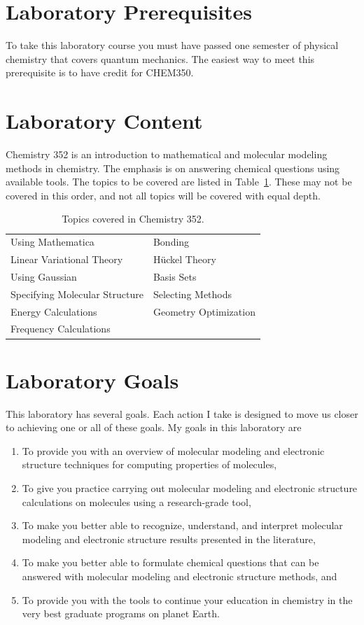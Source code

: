 \documentclass[letterpaper,oneside,onecolumn,11pt,article]{memoir}
\begin{document}
\section{Laboratory Prerequisites}
To take this laboratory course you must have passed one semester of physical chemistry that covers quantum mechanics. The easiest way to meet this prerequisite is to have credit for CHEM350. 

\section{Laboratory Content}
Chemistry 352 is an introduction to mathematical and molecular modeling methods in chemistry. The emphasis is on answering chemical questions using available tools. The topics to be covered are listed in Table~\ref{tab:topics}. These may not be covered in this order, and not all topics will be covered with equal depth. 

\begin{table}[h]
\caption{\sffamily Topics covered in Chemistry 352.}
\label{tab:topics}
\begin{tabular}{l|l} \toprule
Using Mathematica & Bonding \\
Linear Variational Theory & H\"uckel Theory \\
Using Gaussian & Basis Sets \\
Specifying Molecular Structure & Selecting Methods \\
Energy Calculations & Geometry Optimization \\
Frequency Calculations & \\ 
\bottomrule
\end{tabular}
\end{table}
%
%
\section{Laboratory Goals}
This laboratory has several goals. Each action I take is designed to move us closer to achieving one or all of these goals. My goals in this laboratory are
\begin{enumerate}[1.]
\item To provide you with an overview of molecular modeling and electronic structure techniques for computing properties of molecules,
\item To give you practice carrying out molecular modeling and electronic structure calculations on molecules using a research-grade tool,
\item To make you better able to recognize, understand, and interpret molecular modeling and electronic structure results presented in the literature,
\item To make you better able to formulate chemical questions that can be answered with molecular modeling and electronic structure methods, and
\item To provide you with the tools to continue your education in chemistry in the very best graduate programs on planet Earth.
\end{enumerate}
%
%
\end{document}
